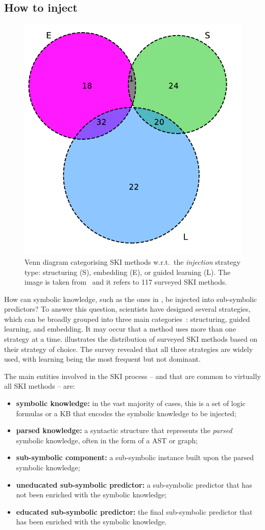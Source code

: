 \subsection{How to inject}\label{subsec:how-to-inject}
%
\begin{figure}
    \centering
    \includegraphics[width=.4\linewidth]{figures/ski-integration}
    \caption[Venn diagram categorising SKI methods]{
        Venn diagram categorising SKI methods w.r.t.\ the \emph{injection} strategy type: structuring (S), embedding (E), or guided learning (L).
        The image is taken from~\cite{DBLP:journals/csur/CiattoSAMO24} and it refers to 117 surveyed \gls{SKI} methods.
    }
    \label{fig:pie-ski-injection}
\end{figure}
%
How can symbolic knowledge, such as the ones in , be injected into sub-symbolic predictors?
%
To answer this question, scientists have designed several strategies, which can be broadly grouped into three main categories~\cite{DBLP:journals/csur/CiattoSAMO24}: structuring, guided learning, and embedding.
%
It may occur that a method uses more than one strategy at a time.
%
 illustrates the distribution of surveyed \gls{SKI} methods based on their strategy of choice.
%
The survey revealed that all three strategies are widely used, with learning being the most frequent but not dominant.

The main entities involved in the \gls{SKI} process -- and that are common to virtually all \gls{SKI} methods -- are:
%
\begin{itemize}
    \item \textbf{symbolic knowledge:} in the vast majority of cases, this is a set of logic formulas or a \gls{KB} that encodes the symbolic knowledge to be injected;
    \item \textbf{parsed knowledge:} a syntactic structure that represents the \emph{parsed} symbolic knowledge, often in the form of a \gls{AST} or graph;
    \item \textbf{sub-symbolic component:} a sub-symbolic instance built upon the parsed symbolic knowledge;
    \item \textbf{uneducated sub-symbolic predictor:} a sub-symbolic predictor that has not been enriched with the symbolic knowledge;
    \item \textbf{educated sub-symbolic predictor:} the final sub-symbolic predictor that has been enriched with the symbolic knowledge.
\end{itemize}
%


